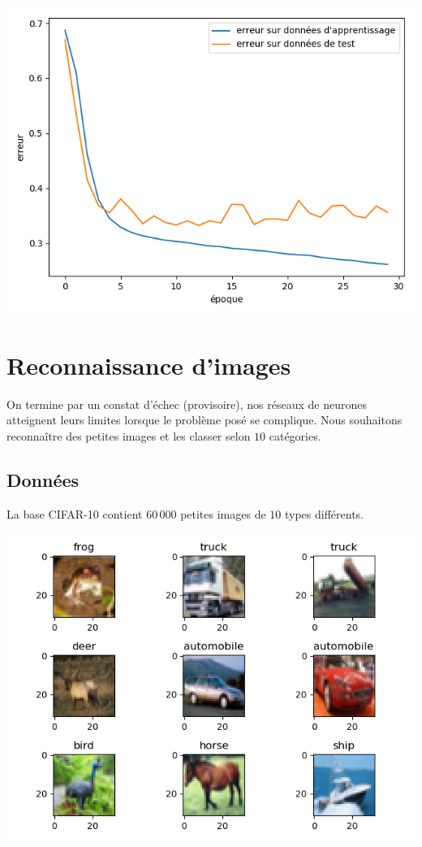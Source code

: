 \documentclass[11pt,class=report,crop=false]{standalone}
\begin{document}
\begin{center}
\includegraphics[scale=\myscale,scale=0.5]{figures/tf2-texte-overfit-loss}
\end{center}


\section{Reconnaissance d'images}

On termine par un constat d'échec (provisoire), nos réseaux de neurones atteignent leurs limites lorsque le problème posé se complique. Nous souhaitons reconnaître des petites images et les classer selon $10$ catégories.

\subsection{Données}

La base CIFAR-10 contient $60\,000$ petites images de $10$ types différents.
\begin{center}
\includegraphics[scale=\myscale,scale=0.7]{figures/tf2-images-train}
\end{center}
\end{document}
